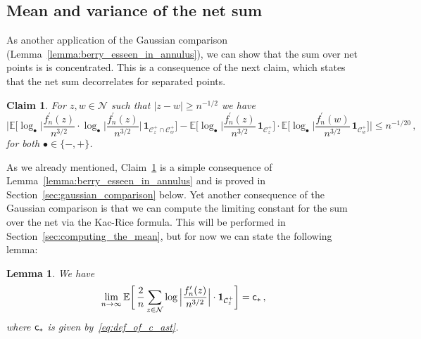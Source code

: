 \documentclass[11pt]{amsart}
\newtheorem{lemma}[theorem]{Lemma}
\newtheorem{claim}[theorem]{Claim}
\theoremstyle{remark}
\theoremstyle{definition}
\newcommand{\bE}{\mathbb E}
\newcommand{\cC}{\mathcal C}
\newcommand{\cN}{\mathcal N}
\newcommand{\one}{\boldsymbol{1}}
\begin{document}
    \subsection{Mean and variance of the net sum}
    As another application of the Gaussian comparison (Lemma~\ref{lemma:berry_esseen_in_annulus}), we can show that the sum over net points is is concentrated. This is a consequence of the next claim, which states that the net sum decorrelates for separated points.   
    \begin{claim}
        \label{claim:decorrelation_in_annulus}
        For $z,w\in \cN$ such that $|z-w|\ge n^{-1/2}$ we have
        \begin{equation*}
            \bigg| \bE\Big[ \log_\bullet\Big|\frac{f_n^\prime(z)}{n^{3/2}} \cdot \log_\bullet\Big|\frac{f_n^\prime(z)}{n^{3/2}} \Big| \, \one_{\cC_z^+\cap\cC_w^+} \Big] - \bE\Big[ \log_\bullet\Big|\frac{f_n^\prime(z)}{n^{3/2}} \, \one_{\cC_z^+} \Big] \cdot \bE\big[ \log_\bullet\Big|\frac{f_n^\prime(w)}{n^{3/2}} \, \one_{\cC_w^+} \Big]  \bigg| \le n^{-1/20} \, ,
        \end{equation*}
        for both $\bullet\in \{-,+\}$. 
    \end{claim}
    As we already mentioned, Claim~\ref{claim:decorrelation_in_annulus} is a simple consequence of Lemma~\ref{lemma:berry_esseen_in_annulus} and is proved in Section~\ref{sec:gaussian_comparison} below. Yet another consequence of the Gaussian comparison is that we can compute the limiting constant for the sum over the net via the Kac-Rice formula. This will be performed in Section~\ref{sec:computing_the_mean}, but for now we can state the following lemma:
    \begin{lemma}
        \label{lemma:computation_of_the_mean_for_sum_over_net}
        We have
        \[
        \lim_{n\to\infty} \bE\bigg[ \,  \frac{2}{n} \sum_{z \in \cN} \log \Big|\frac{f_n'(z)}{n^{3/2}} \Big| \cdot \one_{\cC_z^+} \bigg] = {\sf c}_\ast \, ,
        \]
        where ${\sf c}_\ast$ is given by~\eqref{eq:def_of_c_ast}.
    \end{lemma}
    
\end{document}
